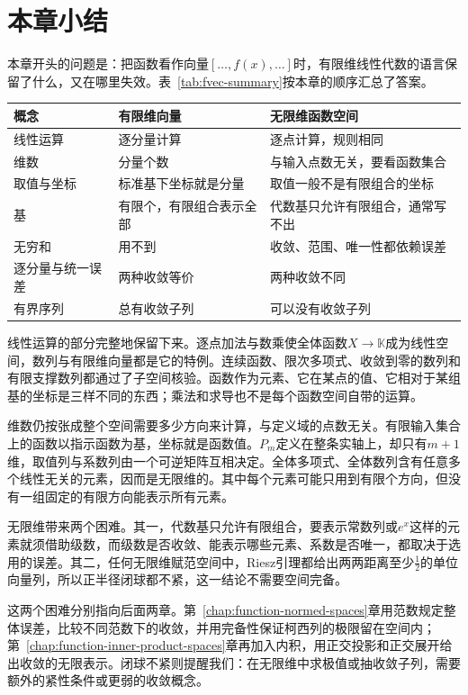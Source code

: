 \section{本章小结}
\label{sec:fvec-summary}

本章开头的问题是：把函数看作向量$[\ldots,f(x),\ldots]$时，有限维线性代数的语言保留了什么，又在哪里失效。表~\ref{tab:fvec-summary}按本章的顺序汇总了答案。

\begin{BookInlineTable}
  \centering
  \begin{tabular}{@{}p{18mm}p{36mm}p{48mm}@{}}
    \toprule
    概念 & 有限维向量 & 无限维函数空间\\
    \midrule
    线性运算 & 逐分量计算 & 逐点计算，规则相同\\
    维数 & 分量个数 & 与输入点数无关，要看函数集合\\
    取值与坐标 & 标准基下坐标就是分量 & 取值一般不是有限组合的坐标\\
    基 & 有限个，有限组合表示全部 & 代数基只允许有限组合，通常写不出\\
    无穷和 & 用不到 & 收敛、范围、唯一性都依赖误差\\
    逐分量与统一误差 & 两种收敛等价 & 两种收敛不同\\
    有界序列 & 总有收敛子列 & 可以没有收敛子列\\
    \bottomrule
  \end{tabular}
  \caption{有限维向量的语言在无限维函数空间中的保留与失效。}
  \label{tab:fvec-summary}
\end{BookInlineTable}

线性运算的部分完整地保留下来。逐点加法与数乘使全体函数$X\to\mathbb K$成为线性空间，数列与有限维向量都是它的特例。连续函数、限次多项式、收敛到零的数列和有限支撑数列都通过了子空间核验。函数作为元素、它在某点的值、它相对于某组基的坐标是三样不同的东西；乘法和求导也不是每个函数空间自带的运算。

维数仍按张成整个空间需要多少方向来计算，与定义域的点数无关。有限输入集合上的函数以指示函数为基，坐标就是函数值。$P_m$定义在整条实轴上，却只有$m+1$维，取值列与系数列由一个可逆矩阵互相决定。全体多项式、全体数列含有任意多个线性无关的元素，因而是无限维的。其中每个元素可能只用到有限个方向，但没有一组固定的有限方向能表示所有元素。

无限维带来两个困难。其一，代数基只允许有限组合，要表示常数列或$e^x$这样的元素就须借助级数，而级数是否收敛、能表示哪些元素、系数是否唯一，都取决于选用的误差。其二，任何无限维赋范空间中，Riesz引理都给出两两距离至少$\tfrac12$的单位向量列，所以正半径闭球都不紧，这一结论不需要空间完备。

这两个困难分别指向后面两章。第~\ref{chap:function-normed-spaces}章用范数规定整体误差，比较不同范数下的收敛，并用完备性保证柯西列的极限留在空间内；第~\ref{chap:function-inner-product-spaces}章再加入内积，用正交投影和正交展开给出收敛的无限表示。闭球不紧则提醒我们：在无限维中求极值或抽收敛子列，需要额外的紧性条件或更弱的收敛概念。
